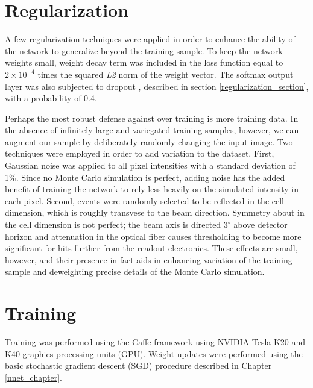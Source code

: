 \section{Regularization}

A few regularization techniques were applied in order to enhance the ability
of the network to generalize beyond the training sample.
To keep the network weights small, weight decay term was included in the loss
function equal to $2\times 10^{-4}$ times the squared \textit{L2} norm of the
weight vector.
The softmax output layer was also subjected to dropout
\cite{hinton2014dropout}, described in section \ref{regularization_section},
with a probability of 0.4.

Perhaps the most robust defense against over training is more training
data.
In the absence of infinitely large and variegated training samples, however,
we can augment our sample by deliberately randomly changing the input image.
Two techniques were employed in order to add variation to the dataset.
First, Gaussian noise was applied to all pixel intensities with
a standard deviation of 1\%.
Since no Monte Carlo simulation is perfect, adding noise has the added benefit
of training the network to rely less heavily on the simulated intensity
in each pixel.
Second, events were randomly selected to be reflected in the cell dimension,
which is roughly transvese to the beam direction.
Symmetry about in the cell dimension is not perfect; the beam axis is directed
$3^{\circ}$ above detector horizon and attenuation in the optical fiber
causes thresholding to become more significant for hits further from
the readout electronics.
These effects are small, however, and their presence in fact aids in
enhancing variation of the training sample and deweighting precise details
of the Monte Carlo simulation.


\section{Training}

Training was performed using the Caffe framework \cite{jia2014caffe}
using NVIDIA Tesla K20 and K40 graphics processing units (GPU).
Weight updates were
performed using the basic stochastic gradient descent (SGD)
\cite{reed1999neural} procedure described in Chapter \ref{nnet_chapter}.

